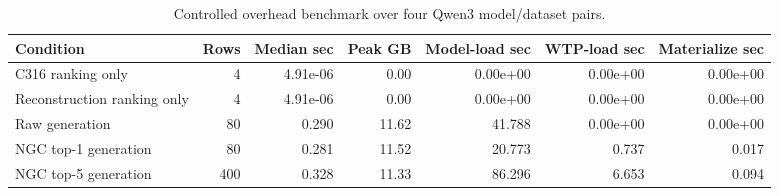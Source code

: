 \begin{table}[t]
\centering
\begin{tabular}{lrrrrrr}
\toprule
Condition & Rows & Median sec & Peak GB & Model-load sec & WTP-load sec & Materialize sec \\
\midrule
C316 ranking only & 4 & 4.91e-06 & 0.00 & 0.00e+00 & 0.00e+00 & 0.00e+00 \\
Reconstruction ranking only & 4 & 4.91e-06 & 0.00 & 0.00e+00 & 0.00e+00 & 0.00e+00 \\
Raw generation & 80 & 0.290 & 11.62 & 41.788 & 0.00e+00 & 0.00e+00 \\
NGC top-1 generation & 80 & 0.281 & 11.52 & 20.773 & 0.737 & 0.017 \\
NGC top-5 generation & 400 & 0.328 & 11.33 & 86.296 & 6.653 & 0.094 \\
\bottomrule
\end{tabular}
\caption{Controlled overhead benchmark over four Qwen3 model/dataset pairs.}
\label{tab:ngc\_controlled\_overhead}
\end{table}
